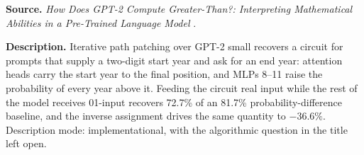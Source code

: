 
\textbf{Source.} \emph{How Does GPT-2 Compute Greater-Than?: Interpreting Mathematical Abilities in a Pre-Trained Language Model} \citep{hanna2023greater}.

\textbf{Description.} Iterative path patching over GPT-2 small recovers a circuit for prompts that supply a two-digit start year and ask for an end year: attention heads carry the start year to the final position, and MLPs 8--11 raise the probability of every year above it. Feeding the circuit real input while the rest of the model receives 01-input recovers 72.7\% of an 81.7\% probability-difference baseline, and the inverse assignment drives the same quantity to $-36.6\%$. Description mode: implementational, with the algorithmic question in the title left open.

